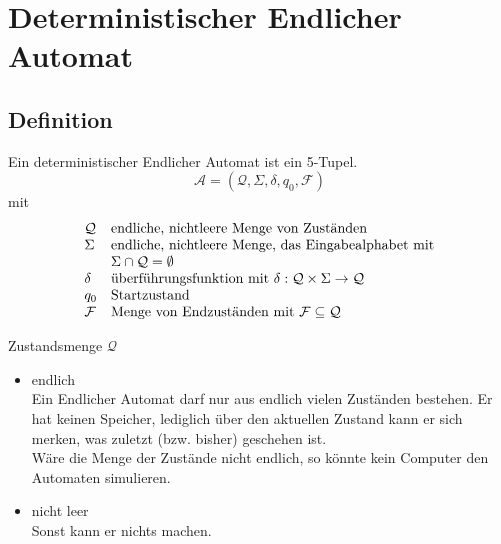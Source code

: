 \documentclass[]{beamer}
\begin{document}
\section{Deterministischer Endlicher Automat}
\subsection{Definition}
\begin{frame}[squeeze]{}
  \begin{definition}
    Ein deterministischer Endlicher Automat ist ein 5-Tupel.
    \[\mathcal{A} = (\mathcal{Q}, \Sigma, \delta, q_0, \mathcal{F})\]
    mit
    \[\begin{array}{l l}
        \mathcal{Q} & \text{endliche, nichtleere Menge von Zust\"anden} \\
        \Sigma      & \text{endliche, nichtleere Menge, das Eingabealphabet mit} \\
                    & \Sigma \cap \mathcal{Q} = \emptyset \\
        \delta & \text{überführungsfunktion mit } \delta : \mathcal{Q} \times \Sigma \rightarrow \mathcal{Q} \\
        q_0         & \text{Startzustand} \\
        \mathcal{F} & \text{Menge von Endzust\"anden mit } \mathcal{F} \subseteq \mathcal{Q} \\
      \end{array}\]
  \end{definition}
\end{frame}

\begin{frame}[squeeze]{}
  \begin{block}{Zustandsmenge $\mathcal{Q}$}
    \begin{itemize}
      \item endlich \\
        Ein Endlicher Automat darf nur aus endlich vielen Zust\"anden bestehen. Er hat keinen Speicher, lediglich über den aktuellen Zustand kann er sich merken, was zuletzt (bzw. bisher) geschehen ist. \\
        W\"are die Menge der Zust\"ande nicht endlich, so k\"onnte kein Computer den Automaten simulieren.
      \item nicht leer \\
        Sonst kann er nichts machen.
    \end{itemize}
  \end{block}
\end{frame}
\end{document}
